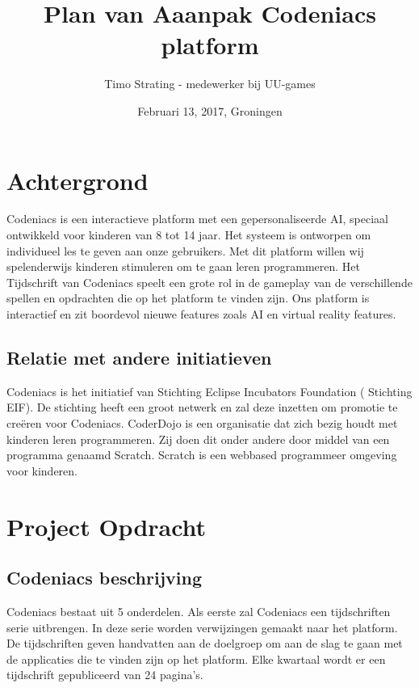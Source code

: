 \documentclass[]{report}
\title{Plan van Aaanpak Codeniacs platform}
\author{Timo Strating - medewerker bij UU-games}
\date{Februari 13, 2017, Groningen}
\begin{document}
\maketitle

\tableofcontents
\newpage






\chapter{Achtergrond}

Codeniacs is een interactieve platform met een gepersonaliseerde AI, speciaal ontwikkeld voor kinderen van 8 tot 14 jaar. Het systeem is ontworpen om individueel les te geven aan onze gebruikers. Met dit platform willen wij spelenderwijs kinderen stimuleren om te gaan leren programmeren. Het Tijdschrift van Codeniacs speelt een grote rol in de gameplay van de verschillende spellen en opdrachten die op het platform te vinden zijn. Ons platform is interactief en zit boordevol nieuwe features zoals AI en virtual reality features.

\section{Relatie met andere initiatieven}
Codeniacs is het initiatief van Stichting Eclipse Incubators Foundation ( Stichting EIF). De stichting heeft een groot netwerk en zal deze inzetten om promotie te cre\"{e}ren voor Codeniacs. CoderDojo is een organisatie dat zich bezig houdt met kinderen leren programmeren. Zij doen dit onder andere door middel van een programma genaamd Scratch. Scratch is een webbased programmeer omgeving voor kinderen.




\chapter{Project Opdracht}

\section{Codeniacs beschrijving}
Codeniacs bestaat uit 5 onderdelen. Als eerste zal Codeniacs een tijdschriften serie uitbrengen. In deze serie worden verwijzingen gemaakt naar het platform. De tijdschriften geven handvatten aan de doelgroep om aan de slag te gaan met de applicaties die te vinden zijn op het platform. Elke kwartaal wordt er een tijdschrift gepubliceerd van 24 pagina's.
\end{document}
